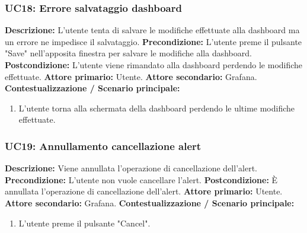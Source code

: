                     \subsubsection{UC18: Errore salvataggio dashboard}
                    \textbf{Descrizione:} L'utente tenta di salvare le modifiche effettuate alla dashboard ma un errore ne impedisce il salvataggio.
                    \newline
                    \textbf{Precondizione:} L'utente preme il pulsante "Save" nell'apposita finestra per salvare le modifiche alla dashboard.
                    \newline
                    \textbf{Postcondizione:} L'utente viene rimandato alla dashboard perdendo le modifiche effettuate.
                    \newline
                    \textbf{Attore primario:} Utente.
                    \newline
                    \textbf{Attore secondario:} Grafana.
                    \newline
                    \textbf{Contestualizzazione / Scenario principale:} \begin{enumerate}
                            \item L'utente torna alla schermata della dashboard perdendo le ultime modifiche effettuate.
                        \end{enumerate}
                        
                    \subsubsection{UC19: Annullamento cancellazione alert}
                    \textbf{Descrizione:} Viene annullata l'operazione di cancellazione dell'alert.
                    \newline
                    \textbf{Precondizione:} L'utente non vuole cancellare l'alert.
                    \newline
                    \textbf{Postcondizione:} È annullata l'operazione di cancellazione dell'alert.
                    \newline
                    \textbf{Attore primario:} Utente.
                    \newline
                    \textbf{Attore secondario:} Grafana.
                    \newline
                    \textbf{Contestualizzazione / Scenario principale:} \begin{enumerate}
                            \item L'utente preme il pulsante "Cancel".
                            
                        \end{enumerate}